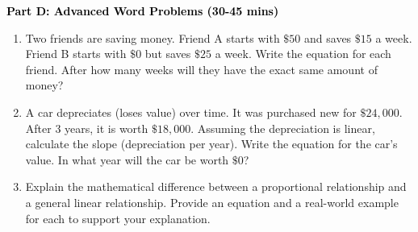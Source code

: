 \documentclass[12pt, letterpaper, fleqn]{article}
\begin{document}
\newpage

\begin{tcolorbox}[colback=customteal!20]
\large\textcolor{black}{\textbf{Part D: Advanced Word Problems (30-45 mins)}}
\end{tcolorbox}

\vspace{3mm}

\begin{enumerate}[itemsep=5.5cm, leftmargin=0.6cm, resume]
\item Two friends are saving money. Friend A starts with $\$50$ and saves $\$15$ a week. Friend B starts with $\$0$ but saves $\$25$ a week. Write the equation for each friend. After how many weeks will they have the exact same amount of money?
\item A car depreciates (loses value) over time. It was purchased new for $\$24,000$. After 3 years, it is worth $\$18,000$. Assuming the depreciation is linear, calculate the slope (depreciation per year). Write the equation for the car's value. In what year will the car be worth $\$0$?
\item Explain the mathematical difference between a proportional relationship and a general linear relationship. Provide an equation and a real-world example for each to support your explanation.
\end{enumerate}
\end{document}
